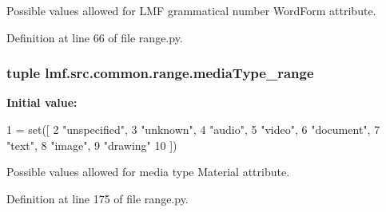 Possible values allowed for L\+M\+F grammatical number Word\+Form attribute. 



Definition at line 66 of file range.\+py.

\hypertarget{namespacelmf_1_1src_1_1common_1_1range_a61963614ed4bb258825e4104a8b47014}{
\subsubsection[{media\+Type\+\_\+range}]{\setlength{\rightskip}{0pt plus 5cm}tuple lmf.\+src.\+common.\+range.\+media\+Type\+\_\+range}}\label{namespacelmf_1_1src_1_1common_1_1range_a61963614ed4bb258825e4104a8b47014}
{\bfseries Initial value\+:}
\begin{DoxyCode}
1 = set([
2     \textcolor{stringliteral}{"unspecified"},
3     \textcolor{stringliteral}{"unknown"},
4     \textcolor{stringliteral}{"audio"},
5     \textcolor{stringliteral}{"video"},
6     \textcolor{stringliteral}{"document"},
7     \textcolor{stringliteral}{"text"},
8     \textcolor{stringliteral}{"image"},
9     \textcolor{stringliteral}{"drawing"}
10 ])
\end{DoxyCode}


Possible values allowed for media type Material attribute. 



Definition at line 175 of file range.\+py.

